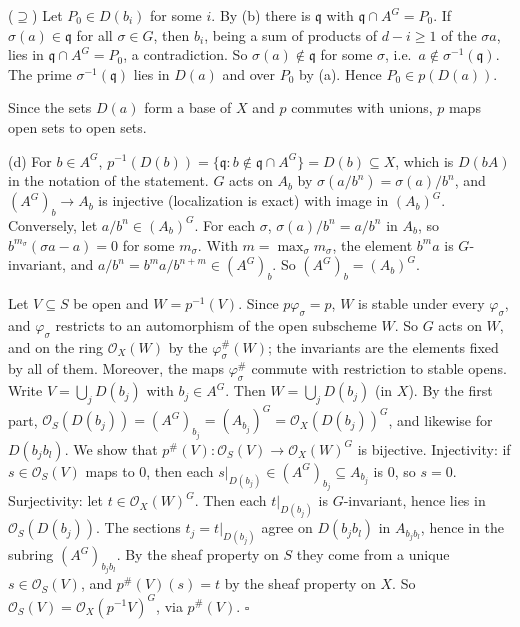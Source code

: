 \documentclass[11pt]{article}
\begin{document}
($\supseteq$) Let $P_0\in D(b_i)$ for some $i$. By (b) there is $\mathfrak q$ with $\mathfrak q\cap A^G=P_0$. If $\sigma(a)\in\mathfrak q$ for all $\sigma\in G$, then $b_i$, being a sum of products of $d-i\ge1$ of the $\sigma a$, lies in $\mathfrak q\cap A^G=P_0$, a contradiction. So $\sigma(a)\notin\mathfrak q$ for some $\sigma$, i.e.\ $a\notin\sigma^{-1}(\mathfrak q)$. The prime $\sigma^{-1}(\mathfrak q)$ lies in $D(a)$ and over $P_0$ by (a). Hence $P_0\in p(D(a))$.

Since the sets $D(a)$ form a base of $X$ and $p$ commutes with unions, $p$ maps open sets to open sets.

(d) For $b\in A^G$, $p^{-1}(D(b))=\{\mathfrak q:b\notin\mathfrak q\cap A^G\}=D(b)\subseteq X$, which is $D(bA)$ in the notation of the statement. $G$ acts on $A_b$ by $\sigma(a/b^n)=\sigma(a)/b^n$, and $(A^G)_b\to A_b$ is injective (localization is exact) with image in $(A_b)^G$. Conversely, let $a/b^n\in(A_b)^G$. For each $\sigma$, $\sigma(a)/b^n=a/b^n$ in $A_b$, so $b^{m_\sigma}(\sigma a-a)=0$ for some $m_\sigma$. With $m=\max_\sigma m_\sigma$, the element $b^ma$ is $G$-invariant, and $a/b^n=b^ma/b^{n+m}\in(A^G)_b$. So $(A^G)_b=(A_b)^G$.

Let $V\subseteq S$ be open and $W=p^{-1}(V)$. Since $p\varphi_\sigma=p$, $W$ is stable under every $\varphi_\sigma$, and $\varphi_\sigma$ restricts to an automorphism of the open subscheme $W$. So $G$ acts on $W$, and on the ring $\mathcal{O}_X(W)$ by the $\varphi_\sigma^\#(W)$; the invariants are the elements fixed by all of them. Moreover, the maps $\varphi_\sigma^\#$ commute with restriction to stable opens. Write $V=\bigcup_jD(b_j)$ with $b_j\in A^G$. Then $W=\bigcup_jD(b_j)$ (in $X$). By the first part, $\mathcal{O}_S(D(b_j))=(A^G)_{b_j}=(A_{b_j})^G=\mathcal{O}_X(D(b_j))^G$, and likewise for $D(b_jb_l)$. We show that $p^\#(V):\mathcal{O}_S(V)\to\mathcal{O}_X(W)^G$ is bijective. Injectivity: if $s\in\mathcal{O}_S(V)$ maps to $0$, then each $s|_{D(b_j)}\in(A^G)_{b_j}\subseteq A_{b_j}$ is $0$, so $s=0$. Surjectivity: let $t\in\mathcal{O}_X(W)^G$. Then each $t|_{D(b_j)}$ is $G$-invariant, hence lies in $\mathcal{O}_S(D(b_j))$. The sections $t_j=t|_{D(b_j)}$ agree on $D(b_jb_l)$ in $A_{b_jb_l}$, hence in the subring $(A^G)_{b_jb_l}$. By the sheaf property on $S$ they come from a unique $s\in\mathcal{O}_S(V)$, and $p^\#(V)(s)=t$ by the sheaf property on $X$. So $\mathcal{O}_S(V)=\mathcal{O}_X(p^{-1}V)^G$, via $p^\#(V)$. \hfill$\square$
\end{document}
